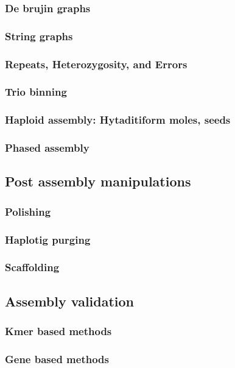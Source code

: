 \subsubsection{De brujin graphs}
\subsubsection{String graphs}
\subsubsection{Repeats, Heterozygosity, and Errors}
\subsubsection{Trio binning}
\subsubsection{Haploid assembly: Hytaditiform moles, seeds}
\subsubsection{Phased assembly}


\subsection{Post assembly manipulations}
\subsubsection{Polishing}
\subsubsection{Haplotig purging}
\subsubsection{Scaffolding}

\subsection{Assembly validation}
\subsubsection{Kmer based methods}
\subsubsection{Gene based methods}
